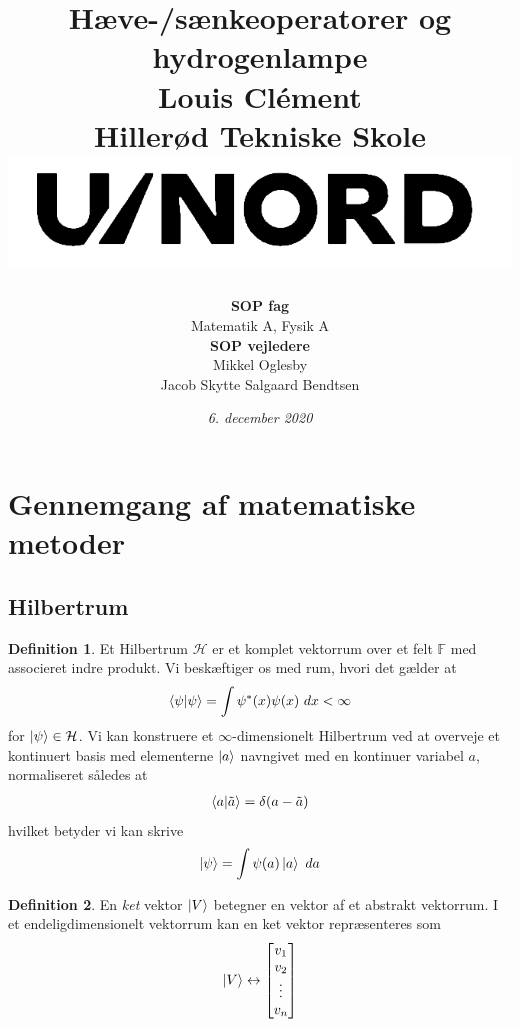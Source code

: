 \documentclass[12pt]{article}
\title{
  {{Hæve-/sænkeoperatorer og hydrogenlampe}}\\
  {\large{Louis Clément}}\\
  {\large Hillerød Tekniske Skole}\\
  \vspace{2cm}
  {\includegraphics[scale=1.5]{gym.png}}
  \vspace*{1.5cm}
}
\author{
  \begin{tabular}[!h]{c}
    \textbf{SOP fag}\\
                Matematik A, Fysik A \\
    \textbf{SOP vejledere}\\
                 Mikkel Oglesby \\ Jacob Skytte Salgaard Bendtsen
  \end{tabular}
}
\date{\vspace*{1cm}\textit{6. december 2020}}
\theoremstyle{definition}
\theoremstyle{remark}
\theoremstyle{definition}
\newtheorem{definition}{Definition}[section]
\newcounter{theo}[section]\setcounter{theo}{0}
\numberwithin{equation}{section}
\begin{document}
\maketitle
\newpage
\tableofcontents

\newpage
\setcounter{page}{1}

\section{Gennemgang af matematiske metoder}
\subsection{Hilbertrum}

\begin{definition}
  Et Hilbertrum $\mathcal H$ er et komplet vektorrum over et felt $\mathbb F$ med associeret indre produkt. Vi beskæftiger os med rum, hvori det gælder at
  \begin{align*}
    \braket{\psi}{\psi} = \int \psi^*(x)\psi(x) ~ dx < \infty
  \end{align*}
  for $\ket \psi \in \mathcal H$. Vi kan konstruere et $\infty$-dimensionelt Hilbertrum ved at overveje et kontinuert basis med elementerne $\ket a$ navngivet med en kontinuer variabel $a$, normaliseret således at
  \begin{align}
    \label{eq:con}
    \braket{a}{\tilde a} = \delta(a-\tilde a)
  \end{align}
  hvilket betyder vi kan skrive
  \begin{align}
    \label{eq:sw}
    \ket \psi = \int \psi(a)\ket a~da
  \end{align}
  
\end{definition}


\begin{definition}
  En \textit{ket} vektor $\ket V$ betegner en vektor af et abstrakt
vektorrum. I et endeligdimensionelt vektorrum kan en ket vektor
repræsenteres som
  \begin{align}
    \label{eq:colv}
    \ket V \leftrightarrow \mqty[v_1\\v_2\\\vdots\\ v_n]
  \end{align}
\end{definition}
\end{document}
